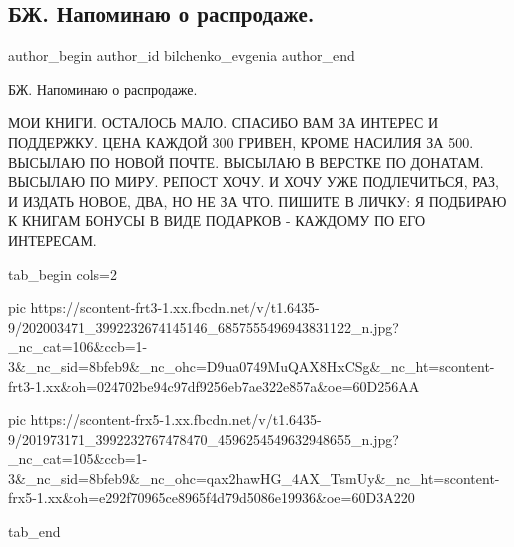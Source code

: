 
 
 
 
 
 
\subsection{БЖ. Напоминаю о распродаже.}
\label{sec:18_06_2021.fb.bilchenko_evgenia.3.pasprodazha}
\ifcmt
 author_begin
   author_id bilchenko_evgenia
 author_end
\fi

БЖ. Напоминаю о распродаже. 

МОИ КНИГИ. ОСТАЛОСЬ МАЛО. СПАСИБО ВАМ ЗА ИНТЕРЕС И ПОДДЕРЖКУ. ЦЕНА КАЖДОЙ 300
ГРИВЕН, КРОМЕ НАСИЛИЯ ЗА 500. ВЫСЫЛАЮ ПО НОВОЙ ПОЧТЕ. ВЫСЫЛАЮ В ВЕРСТКЕ ПО
ДОНАТАМ. ВЫСЫЛАЮ ПО МИРУ. РЕПОСТ ХОЧУ. И ХОЧУ УЖЕ ПОДЛЕЧИТЬСЯ, РАЗ, И ИЗДАТЬ
НОВОЕ, ДВА, НО НЕ ЗА ЧТО. ПИШИТЕ В ЛИЧКУ: Я ПОДБИРАЮ К КНИГАМ БОНУСЫ В ВИДЕ
ПОДАРКОВ - КАЖДОМУ ПО ЕГО ИНТЕРЕСАМ.

\ifcmt
  tab_begin cols=2

     pic https://scontent-frt3-1.xx.fbcdn.net/v/t1.6435-9/202003471_3992232674145146_6857555496943831122_n.jpg?_nc_cat=106&ccb=1-3&_nc_sid=8bfeb9&_nc_ohc=D9ua0749MuQAX8HxCSg&_nc_ht=scontent-frt3-1.xx&oh=024702be94c97df9256eb7ae322e857a&oe=60D256AA

     pic https://scontent-frx5-1.xx.fbcdn.net/v/t1.6435-9/201973171_3992232767478470_4596254549632948655_n.jpg?_nc_cat=105&ccb=1-3&_nc_sid=8bfeb9&_nc_ohc=qax2hawHG_4AX_TsmUy&_nc_ht=scontent-frx5-1.xx&oh=e292f70965ce8965f4d79d5086e19936&oe=60D3A220

  tab_end
\fi

